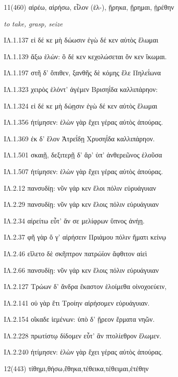 \begin{enumerate}
{ΙΛ.2.777 ἕστασαν: ἅρματα δ' εὖ πεπυκασμένα κεῖτο ἀνάκτων  

ΙΛ.2.790 ἀγχοῦ δ' ἱσταμένη προσέφη πόδας ὠκέα Ἶρις:  

}


\clearpage
\item[\large 11(460)]{\large \g αἱρέω, αἱρήσω, εἷλον (ἑλ-), ᾕρηκα, ᾕρημαι, ᾑρέθην  }

\hspace{0.2cm} \textit{to take, grasp, seize   }

{\g
ΙΛ.1.137 εἰ δέ κε μὴ δώωσιν ἐγὼ δέ κεν αὐτὸς ἕλωμαι

ΙΛ.1.139 ἄξω ἑλών: ὃ δέ κεν κεχολώσεται ὅν κεν ἵκωμαι.

ΙΛ.1.197 στῆ δ' ὄπιθεν, ξανθῆς δὲ κόμης ἕλε Πηλεΐωνα

ΙΛ.1.323 χειρὸς ἑλόντ' ἀγέμεν Βρισηΐδα καλλιπάρηον:

ΙΛ.1.324 εἰ δέ κε μὴ δώῃσιν ἐγὼ δέ κεν αὐτὸς ἕλωμαι

ΙΛ.1.356 ἠτίμησεν: ἑλὼν γὰρ ἔχει γέρας αὐτὸς ἀπούρας.

ΙΛ.1.369 ἐκ δ' ἕλον Ἀτρεΐδῃ Χρυσηΐδα καλλιπάρηον.

ΙΛ.1.501 σκαιῇ, δεξιτερῇ δ' ἄρ' ὑπ' ἀνθερεῶνος ἑλοῦσα

ΙΛ.1.507 ἠτίμησεν: ἑλὼν γὰρ ἔχει γέρας αὐτὸς ἀπούρας.

ΙΛ.2.12 πανσυδίῃ: νῦν γάρ κεν ἕλοι πόλιν εὐρυάγυιαν

ΙΛ.2.29 πανσυδίῃ: νῦν γάρ κεν ἕλοις πόλιν εὐρυάγυιαν

ΙΛ.2.34 αἱρείτω εὖτ' ἄν σε μελίφρων ὕπνος ἀνήῃ.

ΙΛ.2.37 φῆ γὰρ ὅ γ' αἱρήσειν Πριάμου πόλιν ἤματι κείνῳ

ΙΛ.2.46 εἵλετο δὲ σκῆπτρον πατρώϊον ἄφθιτον αἰεὶ

ΙΛ.2.66 πανσυδίῃ: νῦν γάρ κεν ἕλοις πόλιν εὐρυάγυιαν

ΙΛ.2.127 Τρώων δ' ἄνδρα ἕκαστον ἑλοίμεθα οἰνοχοεύειν,

ΙΛ.2.141 οὐ γὰρ ἔτι Τροίην αἱρήσομεν εὐρυάγυιαν.

ΙΛ.2.154 οἴκαδε ἱεμένων: ὑπὸ δ' ᾕρεον ἕρματα νηῶν.

ΙΛ.2.228 πρωτίστῳ δίδομεν εὖτ' ἂν πτολίεθρον ἕλωμεν.

ΙΛ.2.240 ἠτίμησεν: ἑλὼν γὰρ ἔχει γέρας αὐτὸς ἀπούρας.

}

\clearpage
\item[\large 12(443)]{\large \g τίθημι,θήσω,ἔθηκα,τέθεικα,τέθειμαι,ἐτέθην }


\end{enumerate}
